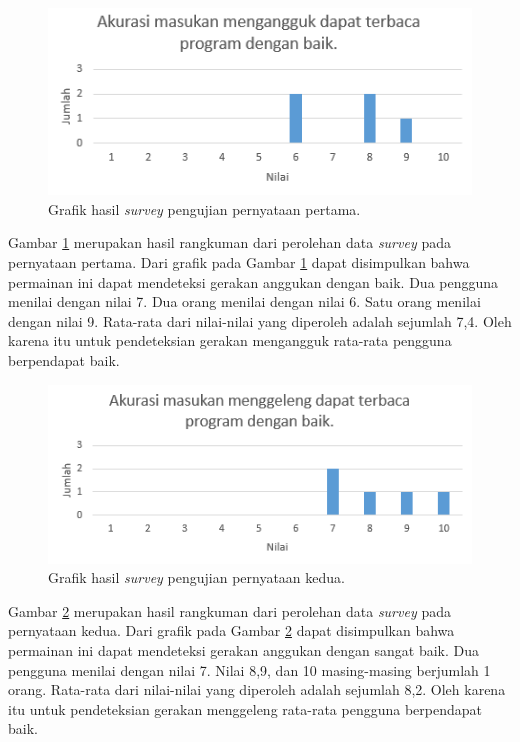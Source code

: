 \begin{figure}[htbp]
\centering
\includegraphics[scale=1]{Gambar/PengujianEksperimental/survey_pertama.PNG}
\caption{Grafik hasil \textit{survey} pengujian pernyataan pertama.} 
\label{fig:survey_pengujian_pertama}
\end{figure}

Gambar \ref{fig:survey_pengujian_pertama} merupakan hasil rangkuman dari perolehan data \textit{survey} pada pernyataan pertama. Dari grafik pada Gambar \ref{fig:survey_pengujian_pertama} dapat disimpulkan bahwa permainan ini dapat mendeteksi gerakan anggukan dengan baik. Dua pengguna menilai dengan nilai 7. Dua orang menilai dengan nilai 6. Satu orang menilai dengan nilai 9. Rata-rata dari nilai-nilai yang diperoleh adalah sejumlah 7,4. Oleh karena itu untuk pendeteksian gerakan mengangguk rata-rata pengguna berpendapat baik.


\begin{figure}[htbp]
\centering
\includegraphics[scale=1]{Gambar/PengujianEksperimental/survey_kedua.PNG}
\caption{Grafik hasil \textit{survey} pengujian pernyataan kedua.} 
\label{fig:survey_pengujian_kedua}
\end{figure}

Gambar \ref{fig:survey_pengujian_kedua} merupakan hasil rangkuman dari perolehan data \textit{survey} pada pernyataan kedua. Dari grafik pada Gambar \ref{fig:survey_pengujian_kedua} dapat disimpulkan bahwa permainan ini dapat mendeteksi gerakan anggukan dengan sangat baik. Dua pengguna menilai dengan nilai 7. Nilai 8,9, dan 10 masing-masing berjumlah 1 orang. Rata-rata dari nilai-nilai yang diperoleh adalah sejumlah 8,2. Oleh karena itu untuk pendeteksian gerakan menggeleng rata-rata pengguna berpendapat baik.

